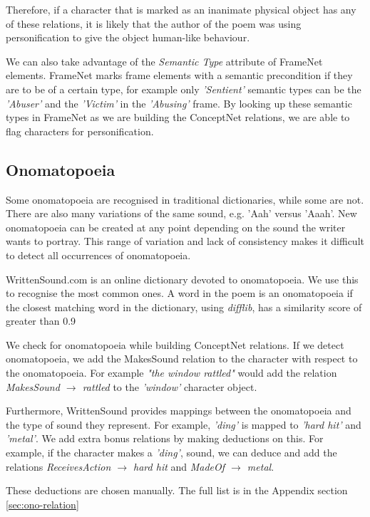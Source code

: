 Therefore, if a character that is marked as an inanimate physical object has any of these relations, it is likely that the author of the poem was using personification to give the object human-like behaviour.

We can also take advantage of the \textit{Semantic Type} attribute of FrameNet elements. FrameNet marks frame elements with a semantic precondition if they are to be of a certain type, for example only \textit{'Sentient'} semantic types can be the \textit{'Abuser'} and the \textit{'Victim'} in the \textit{'Abusing'} frame. By looking up these semantic types in FrameNet as we are building the ConceptNet relations, we are able to flag characters for personification.

\subsection{Onomatopoeia}
\label{sec:ono}
Some onomatopoeia are recognised in traditional dictionaries, while some are not. There are also many variations of the same sound, e.g. 'Aah' versus 'Aaah'. New onomatopoeia can be created at any point depending on the sound the writer wants to portray. This range of variation and lack of consistency makes it difficult to detect all occurrences of onomatopoeia.

WrittenSound.com is an online dictionary devoted to onomatopoeia. We use this to recognise the most common ones. A word in the poem is an onomatopoeia if the closest matching word in the dictionary, using \textit{difflib}, has a similarity score of greater than 0.9

We check for onomatopoeia while building ConceptNet relations. If we detect onomatopoeia, we add the MakesSound relation to the character with respect to the onomatopoeia. For example \textit{"the window rattled"} would add the relation \textit{MakesSound $\rightarrow$ rattled} to the \textit{'window'} character object.

Furthermore, WrittenSound provides mappings between the onomatopoeia and the type of sound they represent. For example, \textit{'ding'} is mapped to \textit{'hard hit'} and \textit{'metal'}. We add extra bonus relations by making deductions on this. For example, if the character makes a \textit{'ding'}, sound, we can deduce and add the relations \textit{ReceivesAction $\rightarrow$ hard hit} and \textit{MadeOf $\rightarrow$ metal}.

These deductions are chosen manually. The full list is in the Appendix section \ref{sec:ono-relation}


